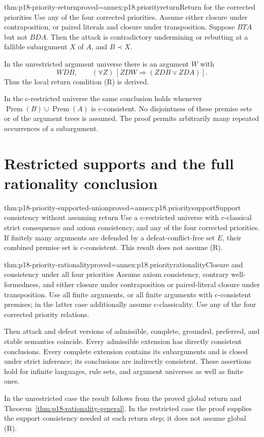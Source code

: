 \begin{hbtheorem}{thm:p18-priority-return}{proved=annex:p18.priorityreturn}{Return for the corrected priorities}
Use any of the four corrected priorities. Assume either closure under
contraposition, or paired literals and closure under transposition.
Suppose \(B T A\) but not \(B D A\).
Then the attack is contradictory undermining or rebutting at a fallible
subargument \(X\) of \(A\), and \(B\prec X\).

In the unrestricted argument universe there is an argument \(W\) with
\[
 W D B,\qquad
 (\forall Z)\,[Z D W\Longrightarrow (Z D B\lor Z D A)].
 \tag{P}
\]
Thus the local return condition (R) is derived.

In the c-restricted universe the same conclusion holds whenever
\(\operatorname{Prem}(B)\cup\operatorname{Prem}(A)\) is c-consistent.
No disjointness of these premise sets or of the argument trees is
assumed. The proof permits arbitrarily many repeated occurrences of
a subargument.
\end{hbtheorem}

\section{Restricted supports and the full rationality conclusion}

\begin{hblemma}{thm:p18-priority-supported-union}{proved=annex:p18.prioritysupport}{Support consistency without assuming return}
Use a c-restricted universe with c-classical strict consequence and
axiom consistency, and any of the four corrected priorities.
If finitely many arguments are defended by a defeat-conflict-free
set \(E\), their combined premise set is c-consistent.
This result does not assume (R).
\end{hblemma}

\begin{hbtheorem}{thm:p18-priority-rationality}{proved=annex:p18.priorityrationality}{Closure and consistency under all four priorities}
Assume axiom consistency, contrary well-formedness, and either closure
under contraposition or paired-literal closure under transposition.
Use all finite arguments, or all finite arguments with c-consistent
premises; in the latter case additionally assume c-classicality.
Use any of the four corrected priority relations.

Then attack and defeat versions of admissible, complete, grounded,
preferred, and stable semantics coincide.
Every admissible extension has directly consistent conclusions.
Every complete extension contains its subarguments and is closed under
strict inference; its conclusions are indirectly consistent.
These assertions hold for infinite languages, rule sets, and argument
universes as well as finite ones.

In the unrestricted case the result follows from the proved global
return and Theorem~\ref{thm:p18-rationality-general}.
In the restricted case the proof supplies the support consistency
needed at each return step; it does not assume global (R).
\end{hbtheorem}

